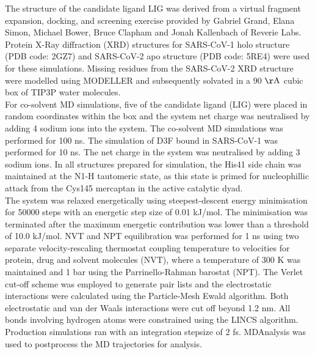 The structure of the candidate ligand LIG was derived from a virtual fragment expansion, docking, and screening exercise provided by Gabriel Grand, Elana Simon, Michael Bower, Bruce Clapham and Jonah Kallenbach of Reverie Labs.\cite{gabereverie} Protein X-Ray diffraction (XRD) structures for SARS-CoV-1 \mpro holo structure (PDB code: 2GZ7) \cite{2gz7} and SARS-CoV-2 \mpro apo structure (PDB code: 5RE4) were used for these simulations. Missing residues from the SARS-CoV-2 XRD structure were modelled using MODELLER \cite{modeller} and subsequently solvated in a 90 $\rm{\AA}$ cubic box of TIP3P water molecules. \\

For co-solvent MD simulations, five of the candidate ligand (LIG) were placed in random coordinates within the box and the system net charge was neutralised by adding 4 sodium ions into the system. The co-solvent MD simulations was performed for 100 ns. The simulation of D3F bound in SARS-CoV-1 \mpro was performed for 10 ns. The net charge in the system was neutralised by adding 3 sodium ions. In all structures prepared for simulation, the His41 side chain was maintained at the N1-H tautomeric state, as this state is primed for nucleophillic attack from the Cys145 mercaptan in the active catalytic dyad.\\

The system was relaxed energetically using steepest-descent energy minimisation for 50000 steps with an energetic step size of 0.01 kJ/mol. The minimisation was terminated after the maximum energetic contribution was lower than a threshold of 10.0 kJ/mol. NVT and NPT equilibration was performed for 1 ns using two separate velocity-rescaling thermostat coupling temperature to velocities for protein, drug and solvent molecules (NVT), where a temperature of 300 K was maintained and 1 bar using the Parrinello-Rahman barostat (NPT).\cite{parrinello1981polymorphic} The Verlet cut-off scheme was employed to generate pair lists and the electrostatic interactions were calculated using the Particle-Mesh Ewald algorithm.\cite{pme} Both electrostatic and van der Waals interactions were cut off beyond 1.2 nm. All bonds involving hydrogen atoms were constrained using the LINCS algorithm.\cite{hess1997lincs} Production simulations ran with an integration stepsize of 2 fs. MDAnalysis was used to postprocess the MD trajectories for analysis.\cite{mdanalysis1, mdanalysis2}\\

